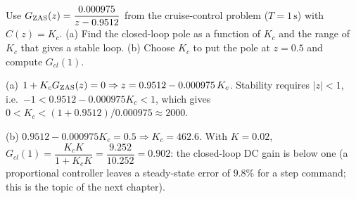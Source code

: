 \begin{problem}
Use $G_{\mathrm{ZAS}}(z)=\dfrac{0.000975}{z-0.9512}$ from the cruise-control problem ($T=1\,\mathrm{s}$) with
$C(z)=K_c$. (a) Find the closed-loop pole as a function of $K_c$ and the range of $K_c$ that gives a
stable loop. (b) Choose $K_c$ to put the pole at $z=0.5$ and compute $G_{cl}(1)$.
\end{problem}
\begin{solution}
(a) $1+K_cG_{\mathrm{ZAS}}(z)=0\Rightarrow z=0.9512-0.000975\,K_c$. Stability requires $|z|<1$, i.e.\
$-1<0.9512-0.000975K_c<1$, which gives $0<K_c<(1+0.9512)/0.000975\approx2000$.\par
(b) $0.9512-0.000975K_c=0.5\Rightarrow K_c=462.6$. With $K=0.02$,
$G_{cl}(1)=\dfrac{K_cK}{1+K_cK}=\dfrac{9.252}{10.252}=0.902$: the closed-loop DC gain is below one (a
proportional controller leaves a steady-state error of $9.8\%$ for a step command; this is the topic of the
next chapter).
\end{solution}

